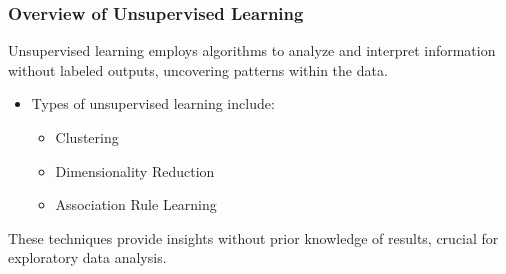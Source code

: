 \documentclass[aspectratio=169]{beamer}
\begin{document}
\begin{frame}[fragile]
    \frametitle{Overview of Unsupervised Learning}
    Unsupervised learning employs algorithms to analyze and interpret information without labeled outputs, uncovering patterns within the data. 
    \begin{itemize}
        \item Types of unsupervised learning include:
        \begin{itemize}
            \item Clustering
            \item Dimensionality Reduction
            \item Association Rule Learning
        \end{itemize}
    \end{itemize}
    These techniques provide insights without prior knowledge of results, crucial for exploratory data analysis.
\end{frame}
\end{document}
